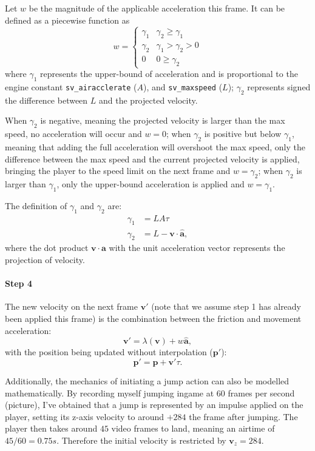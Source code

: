 \documentclass[a4paper,12pt]{article}
\newcommand{\tvec}[1]{\boldsymbol{#1}}
\newcommand{\tunit}[1]{\boldsymbol{\hat{#1}}}
\newcommand{\ta}{\tvec{a}}
\newcommand{\tv}{\tvec{v}}
\newcommand{\tp}{\tvec{p}}
\begin{document}
Let $w$ be the magnitude of the applicable acceleration this frame. It can be defined as a piecewise function as
\[
    w = \begin{cases}
        \gamma_1 & \gamma_2 \ge \gamma_1\\
        \gamma_2 & \gamma_1 > \gamma_2 > 0\\
        0 & 0 \ge \gamma_2
    \end{cases}
\]
where $\gamma_1$ represents the upper-bound of acceleration and is proportional to the engine constant \verb|sv_airacclerate| ($A$), and \verb|sv_maxspeed| ($L$); $\gamma_2$ represents signed the difference between $L$ and the projected velocity.

When $\gamma_2$ is negative, meaning the projected velocity is larger than the max speed, no acceleration will occur and $w=0$; when $\gamma_2$ is positive but below $\gamma_1$, meaning that adding the full acceleration will overshoot the max speed, only the difference between the max speed and the current projected velocity is applied, bringing the player to the speed limit on the next frame and $w=\gamma_2$; when $\gamma_2$ is larger than $\gamma_1$, only the upper-bound acceleration is applied and $w=\gamma_1$.

The definition of $\gamma_1$ and $\gamma_2$ are:
\begin{align*}
    \gamma_1 &= LA\tau\\
    \gamma_2 &= L - \tv \cdot \tunit{\ta},
\end{align*}
where the dot product $\tv \cdot \tunit{\ta}$ with the unit acceleration vector represents the projection of velocity.

\paragraph{Step 4} The new velocity on the next frame $\tv'$ (note that we assume step 1 has already been applied this frame) is the combination between the friction and movement acceleration:
\[
    \tv' = \lambda(\tv) + w \tunit{\ta},
\]
with the position being updated without interpolation ($\tp'$):
\[
    \tp' = \tp + \tv' \tau.
\]

Additionally, the mechanics of initiating a jump action can also be modelled mathematically. By recording myself jumping ingame at 60 frames per second (picture), I've obtained that a jump is represented by an impulse applied on the player, setting its z-axis velocity to around $+284$ the frame after jumping. The player then takes around $45$ video frames to land, meaning an airtime of $45 / 60 =0.75 \si{s}$. Therefore the initial velocity is restricted by $\tv_z = 284$.
\end{document}
